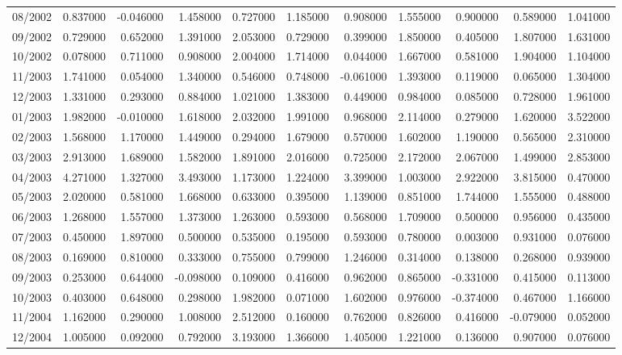 \begin{tabular}{lrrrrrrrrrr}
08/2002 & 0.837000 & -0.046000 & 1.458000 & 0.727000 & 1.185000 & 0.908000 & 1.555000 & 0.900000 & 0.589000 & 1.041000 \\
09/2002 & 0.729000 & 0.652000 & 1.391000 & 2.053000 & 0.729000 & 0.399000 & 1.850000 & 0.405000 & 1.807000 & 1.631000 \\
10/2002 & 0.078000 & 0.711000 & 0.908000 & 2.004000 & 1.714000 & 0.044000 & 1.667000 & 0.581000 & 1.904000 & 1.104000 \\
11/2003 & 1.741000 & 0.054000 & 1.340000 & 0.546000 & 0.748000 & -0.061000 & 1.393000 & 0.119000 & 0.065000 & 1.304000 \\
12/2003 & 1.331000 & 0.293000 & 0.884000 & 1.021000 & 1.383000 & 0.449000 & 0.984000 & 0.085000 & 0.728000 & 1.961000 \\
01/2003 & 1.982000 & -0.010000 & 1.618000 & 2.032000 & 1.991000 & 0.968000 & 2.114000 & 0.279000 & 1.620000 & 3.522000 \\
02/2003 & 1.568000 & 1.170000 & 1.449000 & 0.294000 & 1.679000 & 0.570000 & 1.602000 & 1.190000 & 0.565000 & 2.310000 \\
03/2003 & 2.913000 & 1.689000 & 1.582000 & 1.891000 & 2.016000 & 0.725000 & 2.172000 & 2.067000 & 1.499000 & 2.853000 \\
04/2003 & 4.271000 & 1.327000 & 3.493000 & 1.173000 & 1.224000 & 3.399000 & 1.003000 & 2.922000 & 3.815000 & 0.470000 \\
05/2003 & 2.020000 & 0.581000 & 1.668000 & 0.633000 & 0.395000 & 1.139000 & 0.851000 & 1.744000 & 1.555000 & 0.488000 \\
06/2003 & 1.268000 & 1.557000 & 1.373000 & 1.263000 & 0.593000 & 0.568000 & 1.709000 & 0.500000 & 0.956000 & 0.435000 \\
07/2003 & 0.450000 & 1.897000 & 0.500000 & 0.535000 & 0.195000 & 0.593000 & 0.780000 & 0.003000 & 0.931000 & 0.076000 \\
08/2003 & 0.169000 & 0.810000 & 0.333000 & 0.755000 & 0.799000 & 1.246000 & 0.314000 & 0.138000 & 0.268000 & 0.939000 \\
09/2003 & 0.253000 & 0.644000 & -0.098000 & 0.109000 & 0.416000 & 0.962000 & 0.865000 & -0.331000 & 0.415000 & 0.113000 \\
10/2003 & 0.403000 & 0.648000 & 0.298000 & 1.982000 & 0.071000 & 1.602000 & 0.976000 & -0.374000 & 0.467000 & 1.166000 \\
11/2004 & 1.162000 & 0.290000 & 1.008000 & 2.512000 & 0.160000 & 0.762000 & 0.826000 & 0.416000 & -0.079000 & 0.052000 \\
12/2004 & 1.005000 & 0.092000 & 0.792000 & 3.193000 & 1.366000 & 1.405000 & 1.221000 & 0.136000 & 0.907000 & 0.076000 \\

\end{tabular}

